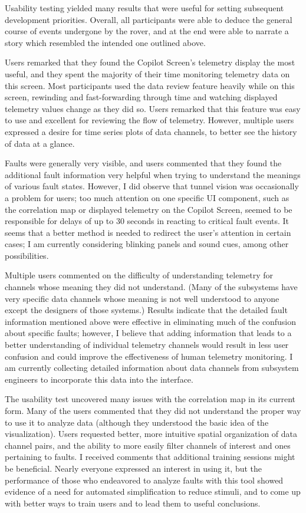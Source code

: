 Usability testing yielded many results that were useful for setting subsequent development priorities. Overall, all participants were able to deduce the general course of events undergone by the rover, and at the end were able to narrate a story which resembled the intended one outlined above.

Users remarked that they found the Copilot Screen's telemetry display the most useful, and they spent the majority of their time monitoring telemetry data on this screen. Most participants used the data review feature heavily while on this screen, rewinding and fast-forwarding through time and watching displayed telemetry values change as they did so. Users remarked that this feature was easy to use and excellent for reviewing the flow of telemetry. However, multiple users expressed a desire for time series plots of data channels, to better see the history of data at a glance.

Faults were generally very visible, and users commented that they found the additional fault information very helpful when trying to understand the meanings of various fault states. However, I did observe that tunnel vision was occasionally a problem for users; too much attention on one specific UI component, such as the correlation map or displayed telemetry on the Copilot Screen, seemed to be responsible for delays of up to 30 seconds in reacting to critical fault events. It seems that a better method is needed to redirect the user's attention in certain cases; I am currently considering blinking panels and sound cues, among other possibilities.

Multiple users commented on the difficulty of understanding telemetry for channels whose meaning they did not understand. (Many of the subsystems have very specific data channels whose meaning is not well understood to anyone except the designers of those systems.) Results indicate that the detailed fault information mentioned above were effective in eliminating much of the confusion about specific faults; however, I believe that adding information that leads to a better understanding of individual telemetry channels would result in less user confusion and could improve the effectiveness of human telemetry monitoring. I am currently collecting detailed information about data channels from subsystem engineers to incorporate this data into the interface.

The usability test uncovered many issues with the correlation map in its current form. Many of the users commented that they did not understand the proper way to use it to analyze data (although they understood the basic idea of the visualization). Users requested better, more intuitive spatial organization of data channel pairs, and the ability to more easily filter channels of interest and ones pertaining to faults. I received comments that additional training sessions might be beneficial. Nearly everyone expressed an interest in using it, but the performance of those who endeavored to analyze faults with this tool showed evidence of a need for automated simplification to reduce stimuli, and to come up with better ways to train users and to lead them to useful conclusions.

